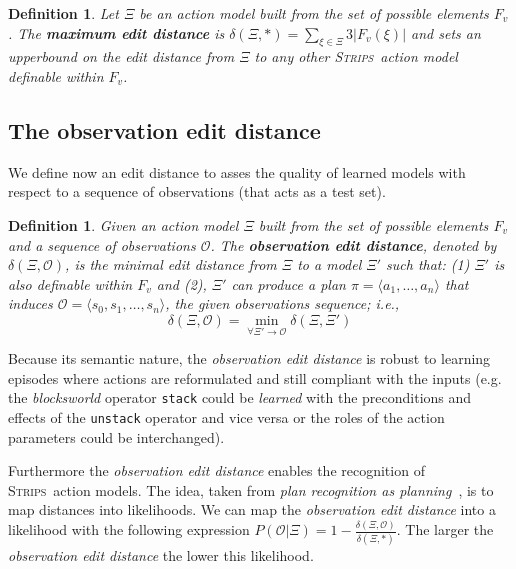 \documentclass{article}
\newcommand{\tup}[1]{{\langle #1 \rangle}}
\newcommand{\strips}{\textsc{Strips}}     %
\newtheorem{definition}[theorem]{Definition}
\begin{document}
\begin{definition}
Let $\Xi$ be an action model built from the set of possible elements $F_v$. The \textbf{maximum edit distance} is $\delta(\Xi,*)=\sum_{\xi\in\Xi} 3|F_v(\xi)|$ and sets an upperbound on the edit distance from $\Xi$ to any other \strips\ action model definable within $F_v$.
\end{definition}

\subsection{The observation edit distance}
We define now an edit distance to asses the quality of learned models with respect to a sequence of observations (that acts as a test set). 

\begin{definition}
Given an action model $\Xi$ built from the set of possible elements $F_v$ and a sequence of observations $\mathcal{O}$. The {\bf observation edit distance}, denoted by  $\delta(\Xi,\mathcal{O})$, is the minimal edit distance from $\Xi$ to a model $\Xi'$ such that: (1) $\Xi'$ is also definable within $F_v$ and (2), $\Xi'$ can produce a plan $\pi=\tup{a_1, \ldots, a_n}$ that induces $\mathcal{O}=\tup{s_0, s_1, \ldots, s_n}$, the given observations sequence; i.e., \[\delta(\Xi,\mathcal{O})=\min_{\forall \Xi' \rightarrow \mathcal{O}} \delta(\Xi,\Xi')\]
\end{definition}

Because its semantic nature, the {\em observation edit distance} is robust to learning episodes where actions are reformulated and still compliant with the inputs (e.g. the {\em blocksworld} operator {\small\tt stack} could be {\em learned} with the preconditions and effects of the {\small\tt unstack} operator and vice versa or the roles of the action parameters could be interchanged).

Furthermore the {\em observation edit distance} enables the recognition of \strips\ action models. The idea, taken from {\em plan recognition as planning}~\cite{ramirez2009plan}, is to map distances into likelihoods. We can map the {\em observation edit distance} into a likelihood with the following expression $P(\mathcal{O}|\Xi)=1-\frac{\delta(\Xi,\mathcal{O})}{\delta(\Xi,*)}$. The larger the {\em observation edit distance} the lower this likelihood.
\end{document}
